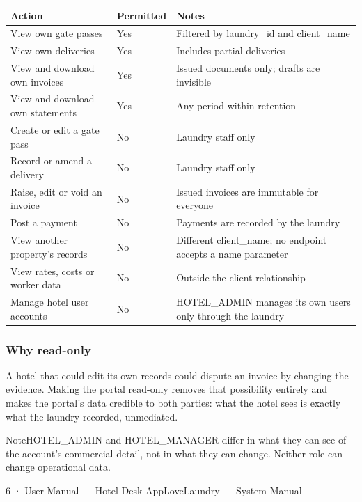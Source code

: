 \documentclass[11pt,a4paper,oneside]{book}
\begin{document}
\begin{center}\small
\begin{tabularx}{\linewidth}{|X|X|X|}
\hline
\rowcolor{lightgrey}
\textbf{Action} & \textbf{Permitted} & \textbf{Notes} \\ \hline
View own gate passes & Yes & Filtered by laundry\_id and client\_name \\ \hline
View own deliveries & Yes & Includes partial deliveries \\ \hline
View and download own invoices & Yes & Issued documents only; drafts are invisible \\ \hline
View and download own statements & Yes & Any period within retention \\ \hline
Create or edit a gate pass & No & Laundry staff only \\ \hline
Record or amend a delivery & No & Laundry staff only \\ \hline
Raise, edit or void an invoice & No & Issued invoices are immutable for everyone \\ \hline
Post a payment & No & Payments are recorded by the laundry \\ \hline
View another property's records & No & Different client\_name; no endpoint accepts a name parameter \\ \hline
View rates, costs or worker data & No & Outside the client relationship \\ \hline
Manage hotel user accounts & No & HOTEL\_ADMIN manages its own users only through the laundry \\ \hline
\end{tabularx}
\end{center}
\subsubsection*{Why read-only}
A hotel that could edit its own records could dispute an invoice by changing the evidence. Making the portal read-only removes that possibility entirely and makes the portal's data credible to both parties: what the hotel sees is exactly what the laundry recorded, unmediated.

\begin{notebox}NoteHOTEL\_ADMIN and HOTEL\_MANAGER differ in what they can see of the account's commercial detail, not in what they can change. Neither role can change operational data.\end{notebox}
6 · User Manual — Hotel Desk AppLoveLaundry — System Manual
\end{document}
